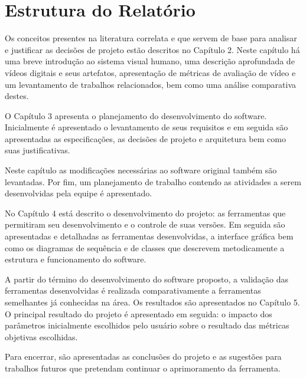 \section{Estrutura do Relatório}

Os conceitos presentes na literatura correlata e que servem de base para analisar e justificar as decisões de projeto estão descritos no Capítulo 2. Neste capítulo há uma breve introdução ao sistema visual humano, uma descrição aprofundada de vídeos digitais e seus artefatos, apresentação de métricas de avaliação de vídeo e um levantamento de trabalhos relacionados, bem como uma análise comparativa destes.

O Capítulo 3 apresenta o planejamento do desenvolvimento do software. Inicialmente é apresentado o levantamento de seus requisitos e em seguida são apresentadas as especificações, as decisões de projeto e arquitetura bem como suas justificativas.

Neste capítulo as modificações necessárias ao software original também são levantadas. Por fim, um planejamento de trabalho contendo as atividades a serem desenvolvidas pela equipe é apresentado.

No Capítulo 4 está descrito o desenvolvimento do projeto: as ferramentas que permitiram seu desenvolvimento e o controle de suas versões. Em seguida são apresentadas e detalhadas as ferramentas desenvolvidas, a interface gráfica bem como os diagramas de sequência e de classes que descrevem metodicamente a estrutura e funcionamento do software.

A partir do término do desenvolvimento do software proposto, a validação das ferramentas desenvolvidas é realizada comparativamente a ferramentas semelhantes já conhecidas na área. Os resultados são apresentados no Capítulo 5. O principal resultado do projeto é apresentado em seguida: o impacto dos parâmetros inicialmente escolhidos pelo usuário sobre o resultado das métricas objetivas escolhidas.

Para encerrar, são apresentadas as conclusões do projeto e as sugestões para trabalhos futuros que pretendam continuar o aprimoramento da ferramenta.
